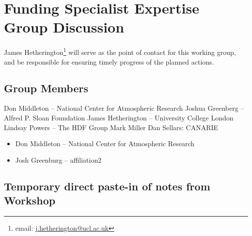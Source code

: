 \section{Funding Specialist Expertise Group Discussion}
\label{sec:appendix_funding_spec_expert}

James Hetherington\footnote{email: \href{mailto:j.hetherington@ucl.ac.uk}{j.hetherington@ucl.ac.uk}}
will serve as the point of contact for this working group, and be responsible for ensuring timely progress of the planned actions.

\subsection{Group Members}

Don Middleton -- National Center for Atmospheric Research
Joshua Greenberg -- Alfred P. Sloan Foundation
James Hetherington -- University College London
Lindsay Powers -- The HDF Group
Mark Miller
Dan Sellars: CANARIE

\begin{itemize}
\item Don Middleton -- National Center for Atmospheric Research
\item Josh Greenburg -- affiliation2
\end{itemize}

\subsection{Temporary direct paste-in of notes from Workshop}

